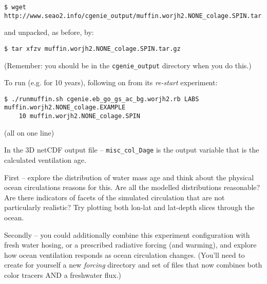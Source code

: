 \documentclass[11pt,fleqn]{book} %
\begin{document}
\vspace{-1mm}
\small
\begin{verbatim}
$ wget http://www.seao2.info/cgenie_output/muffin.worjh2.NONE_colage.SPIN.tar.gz
\end{verbatim}
\normalsize
\vspace{-1mm}

\noindent and unpacked, as before, by:

\vspace{-1mm}
\begin{verbatim}
$ tar xfzv muffin.worjh2.NONE_colage.SPIN.tar.gz
\end{verbatim}
\vspace{-1mm}

\noindent (Remember: you should be in the \texttt{cgenie\_output} directory when you do this.)

To run (e.g. for 10 years), following on from its \textit{re-start} experiment:

\vspace{-1mm}
\small
\begin{verbatim}
$ ./runmuffin.sh cgenie.eb_go_gs_ac_bg.worjh2.rb LABS muffin.worjh2.NONE_colage.EXAMPLE
    10 muffin.worjh2.NONE_colage.SPIN
\end{verbatim}
\normalsize
\vspace{-1mm}

\noindent (all on one line)

In the 3D netCDF output file -- \texttt{misc\_col\_Dage} is the output variable that is the calculated ventilation age.

First -- explore the distribution of water mass age and think about the physical ocean circulations reasons for this. Are all the modelled distributions reasonable? Are there indicators of facets of the simulated circulation that are not particularly realistic? Try plotting both lon-lat and lat-depth slices through the ocean.

Secondly -- you could additionally combine this experiment configuration with fresh water hosing, or a prescribed radiative forcing (and warming), and explore how ocean ventilation responds as ocean circulation changes. (You'll need to create for yourself a new \textit{forcing} directory and set of files that now combines both color tracers AND a freshwater flux.)

\end{document}
